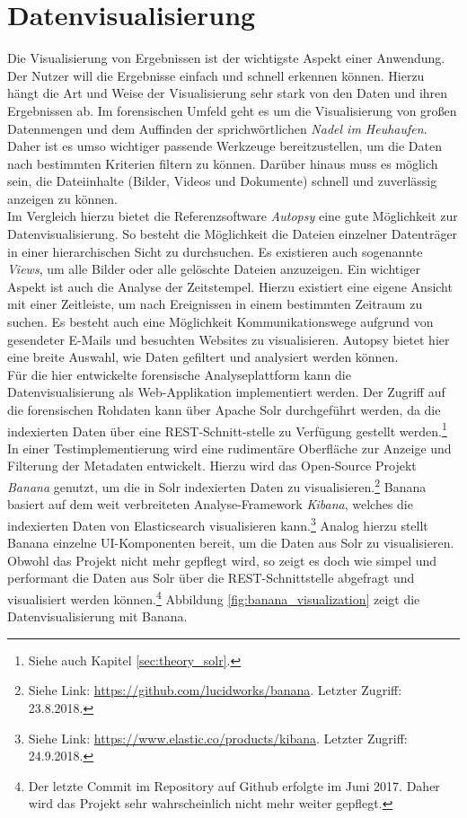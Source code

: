 \chapter{Datenvisualisierung}
\label{ch:data_visualization}

Die Visualisierung von Ergebnissen ist der wichtigste Aspekt einer Anwendung. Der Nutzer will die Ergebnisse einfach und schnell erkennen können. Hierzu hängt die Art und Weise der Visualisierung sehr stark von den Daten und ihren Ergebnissen ab. Im forensischen Umfeld geht es um die Visualisierung von großen Datenmengen und dem Auffinden der sprichwörtlichen \textit{Nadel im Heuhaufen}. Daher ist es umso wichtiger passende Werkzeuge bereitzustellen, um die Daten nach bestimmten Kriterien filtern zu können. Darüber hinaus muss es möglich sein, die Dateiinhalte (Bilder, Videos und  Dokumente) schnell und zuverlässig anzeigen zu können.\\

\noindent
Im Vergleich hierzu bietet die Referenzsoftware \textit{Autopsy} eine gute Möglichkeit zur Datenvisualisierung. So besteht die Möglichkeit die Dateien einzelner Datenträger in einer hierarchischen Sicht zu durchsuchen. Es existieren auch sogenannte \textit{Views}, um alle Bilder oder alle gelöschte Dateien anzuzeigen. Ein wichtiger Aspekt ist auch die Analyse der Zeitstempel. Hierzu existiert eine eigene Ansicht mit einer Zeitleiste, um nach Ereignissen in einem bestimmten Zeitraum zu suchen. Es besteht auch eine Möglichkeit Kommunikationswege aufgrund von gesendeter E-Mails und besuchten Websites zu visualisieren. Autopsy bietet hier eine breite Auswahl, wie Daten gefiltert und analysiert werden können.\\

\noindent
Für die hier entwickelte forensische Analyseplattform kann die Datenvisualisierung als Web-Applikation implementiert werden. Der Zugriff auf die forensischen Rohdaten kann über Apache Solr durchgeführt werden, da die indexierten Daten über eine REST-Schnitt-stelle zu Verfügung gestellt werden.\footnote{Siehe auch Kapitel \ref{sec:theory_solr}.}\\

\noindent
In einer Testimplementierung wird eine rudimentäre Oberfläche zur Anzeige und Filterung der Metadaten entwickelt. Hierzu wird das Open-Source Projekt \textit{Banana} genutzt, um die in Solr indexierten Daten zu visualisieren.\footnote{Siehe Link: \url{https://github.com/lucidworks/banana}. Letzter Zugriff: 23.8.2018.} Banana basiert auf dem weit verbreiteten Analyse-Framework \textit{Kibana}, welches die indexierten Daten von Elasticsearch visualisieren kann.\footnote{Siehe Link: \url{https://www.elastic.co/products/kibana}. Letzter Zugriff: 24.9.2018.} Analog hierzu stellt Banana einzelne UI-Komponenten bereit, um die Daten aus Solr zu visualisieren. Obwohl das Projekt nicht mehr gepflegt wird, so zeigt es doch wie simpel und performant die Daten aus Solr über die REST-Schnittstelle abgefragt und visualisiert werden können.\footnote{Der letzte Commit im Repository auf Github erfolgte im Juni 2017. Daher wird das Projekt sehr wahrscheinlich nicht mehr weiter gepflegt.}
Abbildung \ref{fig:banana_visualization} zeigt die Datenvisualisierung mit Banana.


